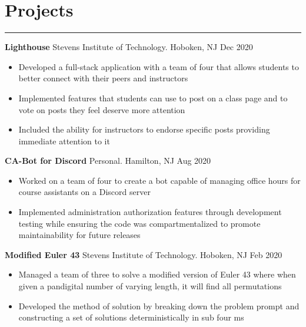 \documentclass[10pt]{article}
\newcommand{\resumesection}[1]{\vspace{-0.2cm}\section*{#1}\vspace{-0.2cm}\hrule\vspace{0.2cm}}
\begin{document}
\resumesection{Projects}


\textbf{Lighthouse} Stevens Institute of Technology. Hoboken, NJ \hfill Dec 2020\par
\begin{itemize}
	\item Developed a full-stack application with a team of four that allows students to better connect with their peers and instructors
	\item Implemented features that students can use to post on a class page and to vote on posts they feel deserve more attention
	\item Included the ability for instructors to endorse specific posts providing immediate attention to it
\end{itemize}

\textbf{CA-Bot for Discord} Personal. Hamilton, NJ \hfill Aug 2020\par
\begin{itemize}
	\item Worked on a team of four to create a bot capable of managing office hours for course assistants on a Discord server
	\item Implemented administration authorization features through development testing while ensuring the code was compartmentalized to promote maintainability for future releases
\end{itemize}

\textbf{Modified Euler 43} Stevens Institute of Technology. Hoboken, NJ \hfill Feb 2020\par
\begin{itemize}
	\item Managed a team of three to solve a modified version of Euler 43 where when given a pandigital number of varying length, it will find all permutations
	\item Developed the method of solution by breaking down the problem prompt and constructing a set of solutions deterministically in sub four ms 
\end{itemize}
\end{document}
